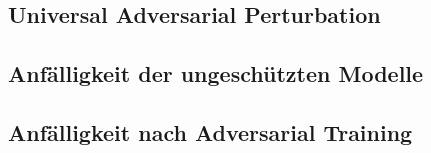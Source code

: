 \subsection{Universal Adversarial Perturbation}


\subsection{Anfälligkeit der ungeschützten Modelle}



\subsection{Anfälligkeit nach Adversarial Training}

